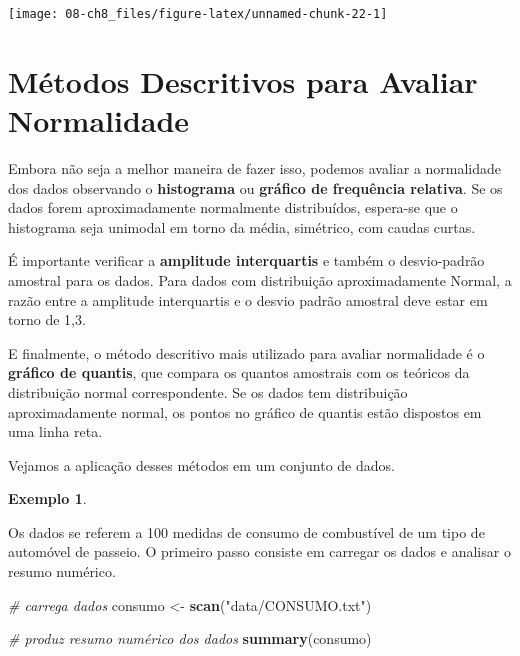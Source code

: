 \documentclass[
]{book}
\newenvironment{Shaded}{\begin{snugshade}}{\end{snugshade}}
\newcommand{\CommentTok}[1]{\textcolor[rgb]{0.56,0.35,0.01}{\textit{#1}}}
\newcommand{\KeywordTok}[1]{\textcolor[rgb]{0.13,0.29,0.53}{\textbf{#1}}}
\newcommand{\NormalTok}[1]{#1}
\newcommand{\StringTok}[1]{\textcolor[rgb]{0.31,0.60,0.02}{#1}}
\theoremstyle{definition}
\theoremstyle{definition}
\newtheorem{example}{Exemplo}[chapter]
\theoremstyle{definition}
\theoremstyle{remark}
\begin{document}
\begin{center}\texttt{[image: 08-ch8\_files/figure-latex/unnamed-chunk-22-1]} \end{center}

\hypertarget{muxe9todos-descritivos-para-avaliar-normalidade}{%
\section{Métodos Descritivos para Avaliar Normalidade}\label{muxe9todos-descritivos-para-avaliar-normalidade}}

Embora não seja a melhor maneira de fazer isso, podemos avaliar a normalidade dos dados observando o \textbf{histograma} ou \textbf{gráfico de frequência relativa}. Se os dados forem aproximadamente normalmente distribuídos, espera-se que o histograma seja unimodal em torno da média, simétrico, com caudas curtas.

É importante verificar a \textbf{amplitude interquartis} e também o desvio-padrão amostral para os dados. Para dados com distribuição aproximadamente Normal, a razão entre a amplitude interquartis e o desvio padrão amostral deve estar em torno de 1,3.

E finalmente, o método descritivo mais utilizado para avaliar normalidade é o \textbf{gráfico de quantis}, que compara os quantos amostrais com os teóricos da distribuição normal correspondente. Se os dados tem distribuição aproximadamente normal, os pontos no gráfico de quantis estão dispostos em uma linha reta.

Vejamos a aplicação desses métodos em um conjunto de dados.

\begin{example}
\protect\hypertarget{exm:unnamed-chunk-23}{}{\label{exm:unnamed-chunk-23} }
\end{example}

Os dados se referem a 100 medidas de consumo de combustível de um tipo de automóvel de passeio. O primeiro passo consiste em carregar os dados e analisar o resumo numérico.

\begin{Shaded}
\begin{Highlighting}[]
\CommentTok{# carrega dados}
\NormalTok{consumo <-}\StringTok{ }\KeywordTok{scan}\NormalTok{(}\StringTok{"data/CONSUMO.txt"}\NormalTok{)}

\CommentTok{# produz resumo numérico dos dados}
\KeywordTok{summary}\NormalTok{(consumo)}
\end{Highlighting}
\end{Shaded}
\end{document}
